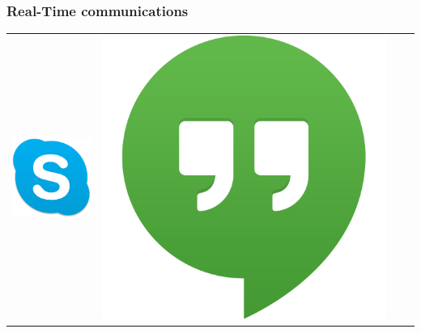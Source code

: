 \documentclass[compress]{beamer}
\begin{document}
		\begin{frame}[c]
		\frametitle{Real-Time communications}

\begin{table}[]
\centering
\label{my-label}
\begin{tabular}{cccc}
 \begin{minipage}{.2\textwidth}\includegraphics[width=\linewidth]{figures/skype.png}\end{minipage} &  
 \begin{minipage}{.2\textwidth}\includegraphics[width=\linewidth]{figures/hangouts.png}\end{minipage} &  

\end{tabular}
\end{table}
\end{frame}
\end{document}
